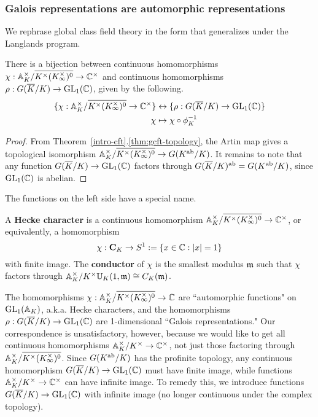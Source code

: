 \subsubsection{Galois representations are automorphic representations}
We rephrase global class field theory in the form that generalizes under the Langlands program.
\begin{thm}
There is a bijection between continuous homomorphisms $\chi:\mathbb{A}_K^{\times}/\overline{K^{\times}(K^{\times}_{\infty})^0}\to \mathbb{C}^{\times}$ and continuous homomorphisms $\rho:G(\overline{K}/K)\to \operatorname{GL}_1(\mathbb{C})$, given by the following.
\begin{align*}
\{
\chi:\mathbb{A}_K^{\times}/\overline{K^{\times}(K^{\times}_{\infty})^0}\to \mathbb{C}^{\times}
\}
&\leftrightarrow
\{\rho:G(\overline{K}/K)\to \operatorname{GL}_1(\mathbb{C})\} \\
\chi&\mapsto \chi\circ \phi_K^{-1}
\end{align*}
\end{thm}
\begin{proof}
From Theorem~\ref{intro-cft}.\ref{thm:gcft-topology}, the Artin map gives a topological isomorphism $ \mathbb{A}_K^{\times}/\overline{K^{\times}(K^{\times}_{\infty})^0}\to G(K^{\text{ab}}/K)$. It remains to note that any function $G(\overline{K}/K)\to \operatorname{GL}_1(\mathbb{C})$ factors through $G(\overline{K}/K)^{\text{ab}}=G(K^{\text{ab}}/K)$, since $\operatorname{GL}_1(\mathbb{C})$ is abelian.
\end{proof}
The functions on the left side have a special name.
\begin{df}
A \textbf{Hecke character} is a continuous homomorphism $\mathbb{A}_K^{\times}/\overline{K^{\times}(K^{\times}_{\infty})^0}\to \mathbb{C}^{\times}$, or equivalently, a homomorphism
\[\chi:\mathbf C_K\to S^1:=\left\{{x\in \mathbb{C}}:{|x|=1}\right\}\]
with finite image.  
The \textbf{conductor} of $\chi$ is the smallest modulus $\mathfrak{m}$ such that $\chi$ factors through $\mathbb{A}_K^{\times}/K^{\times}\mathbb U_K(1,\mathfrak{m})\cong C_K(\mathfrak{m})$. 
\end{df}

The homomorphisms $\chi:\mathbb{A}_K^{\times}/\overline{K^{\times}(K^{\times}_{\infty})^0}\to \mathbb{C}$ are ``automorphic functions" on $\operatorname{GL}_1(\mathbb{A}_K)$, a.k.a. Hecke characters, and the homomorphisms $\rho:G(\overline{K}/K)\to \operatorname{GL}_1(\mathbb{C})$ are 1-dimensional ``Galois representations." Our correspondence is unsatisfactory, however, because we would like to get all continuous homomorphisms $\mathbb{A}_K^{\times}/K^{\times}\to \mathbb{C}^{\times}$, not just those factoring through $\mathbb{A}_K^{\times}/\overline{K^{\times}(K^{\times}_{\infty})^0}$. Since $G(K^{\text{ab}}/K)$ has the profinite topology, %
any continuous homomorphism $G(\overline{K}/K)\to \operatorname{GL}_1(\mathbb{C})$ must have finite image, while functions $\mathbb{A}_K^{\times}/K^{\times}\to \mathbb{C}^{\times}$ can have infinite image. To remedy this, we introduce functions $G(\overline{K}/K)\to \operatorname{GL}_1(\mathbb{C})$ with infinite image (no longer continuous under the complex topology).

